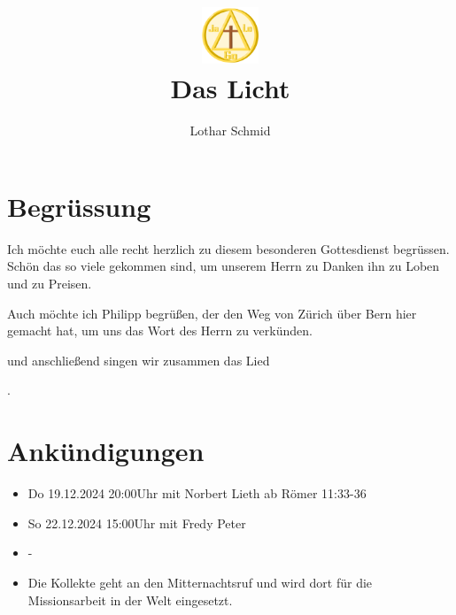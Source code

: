 \documentclass{../inc/mybib}
\title{\includegraphics[height=48pt]{../assets/images/logo.png} \\Das Licht}
\author{Lothar Schmid}
\begin{document}
\maketitle
\section{Begrüssung}

Ich möchte euch alle recht herzlich zu diesem besonderen Gottesdienst begrüssen. Schön das so viele gekommen sind, um unserem Herrn zu Danken ihn zu Loben und zu Preisen.

Auch möchte ich Philipp begrüßen, der den Weg von Zürich über Bern hier gemacht hat, um uns das Wort des Herrn zu verkünden. 

\noindent
\beten{} und anschließend singen wir zusammen das Lied

\noindent
{}.

\section{Ankündigungen}
\begin{itemize}
    \item {} Do 19.12.2024 20:00Uhr mit Norbert Lieth ab Römer 11:33-36
    \item {} So 22.12.2024 15:00Uhr mit Fredy Peter
    \item {} -
    \item {} Die Kollekte geht an den Mitternachtsruf und wird dort für die Missionsarbeit in der Welt eingesetzt.
\end{itemize}
\end{document}
